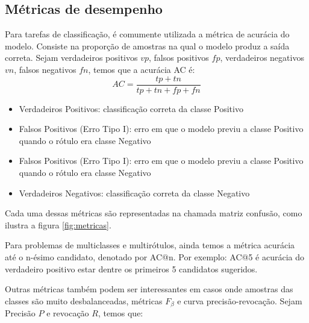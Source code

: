 \subsection{Métricas de desempenho}\label{sec:cap2_metricas_desempenho}


Para tarefas de classificação, é comumente utilizada a métrica de acurácia do modelo. Consiste na proporção de amostras na qual o modelo produz a saída correta. Sejam verdadeiros positivos $vp$, falsos positivos $fp$, verdadeiros negativos $vn$, falsos negativos $fn$, temos que a acurácia AC é:
\begin{equation}AC = \frac{tp + tn}{tp + tn + fp + fn} \end{equation}

\begin{itemize}
    \item Verdadeiros Positivos: classificação correta da classe Positivo
    \item Falsos Positivos (Erro Tipo I): erro em que o modelo previu a classe Positivo quando o rótulo era classe Negativo
    \item Falsos Positivos (Erro Tipo I): erro em que o modelo previu a classe Positivo quando o rótulo era classe Negativo
    \item Verdadeiros Negativos: classificação correta da classe Negativo
\end{itemize}

Cada uma dessas métricas são representadas na chamada matriz confusão, como ilustra a figura \ref{fig:metricas}.

Para problemas de multiclasses e multirótulos, ainda temos a métrica acurácia até o n-ésimo candidato, denotado por AC@n. Por exemplo: AC@5 é acurácia do verdadeiro positivo estar dentre os primeiros 5 candidatos sugeridos.

Outras métricas também podem ser interessantes em casos onde amostras das classes são muito desbalanceadas, métricas $F_\beta$ e curva precisão-revocação. Sejam Precisão $P$ e revocação $R$, temos que:



